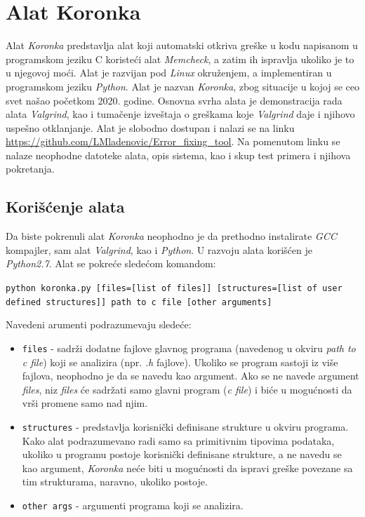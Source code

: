 \documentclass[12pt,oneside]{memoir}
\theoremstyle{plain}
\theoremstyle{definition}
\begin{document}

\chapter{Alat Koronka}
Alat \textit{Koronka} predstavlja alat koji automatski otkriva greške u kodu napisanom u programskom jeziku C koristeći alat \textit{Memcheck}, a zatim ih ispravlja ukoliko je to u njegovoj moći. Alat je razvijan pod \textit{Linux} okruženjem, a implementiran u programskom jeziku \textit{Python}. Alat je nazvan \textit{Koronka}, zbog situacije u kojoj se ceo svet našao početkom 2020. godine. Osnovna svrha alata je demonstracija rada alata \textit{Valgrind}, kao i tumačenje izveštaja o greškama koje \textit{Valgrind} daje i njihovo uspešno otklanjanje. Alat je slobodno dostupan i nalazi se na linku \url{https://github.com/LMladenovic/Error_fixing_tool}. Na pomenutom linku se nalaze neophodne datoteke alata, opis sistema, kao i skup test primera i njihova pokretanja.

\section{Korišćenje alata}
Da biste pokrenuli alat \textit{Koronka} neophodno je da prethodno instalirate \textit{GCC} kompajler, sam alat \textit{Valgrind}, kao i \textit{Python}. U razvoju alata korišćen je \textit{Python2.7}. Alat se pokreće sledećom komandom:
\begin{center}
\texttt{python koronka.py [files=[list of files]] [structures=[list of user defined structures]] path to c file [other arguments]}
\end{center}
Navedeni arumenti podrazumevaju sledeće:
\begin{itemize}
\item \texttt{files} - sadrži dodatne fajlove glavnog programa (navedenog u okviru \textit{path to c file}) koji se analizira (npr. \textit{.h} fajlove). Ukoliko se program sastoji iz više fajlova, neophodno je da se navedu kao argument. Ako se ne navede argument \textit{files}, niz \textit{files} će sadržati samo glavni program (\textit{c file}) i biće u mogućnosti da vrši promene samo nad njim.
\item \texttt{structures} - predstavlja korisnički definisane strukture u okviru programa. Kako alat podrazumevano radi samo sa primitivnim tipovima podataka, ukoliko u programu postoje korisnički definisane strukture, a ne navedu se kao argument, \textit{Koronka} neće biti u mogućnosti da ispravi greške povezane sa tim strukturama, naravno, ukoliko postoje.
\item \texttt{other args} - argumenti programa koji se analizira.
\end{itemize}
\end{document}
